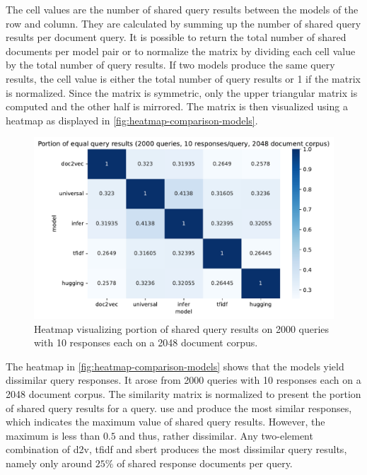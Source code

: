The cell values are the number of shared query results between the models of the row and column.
They are calculated by summing up the number of shared query results per document query.
It is possible to return the total number of shared documents per model pair
or to normalize the matrix by dividing each cell value by the total number of query results.
If two models produce the same query results, the cell value is either the total number of query results or 1 if the matrix is normalized.
Since the matrix is symmetric, only the upper triangular matrix is computed and the other half is mirrored.
The matrix is then visualized using a heatmap as displayed in \autoref{fig:heatmap-comparison-models}.

\begin{figure}[!htb] %
    \centering
    \includegraphics[width=1\textwidth]{images/comparison/Portion_of_equal_query_results_(2000_queries,_10_responses_query,_2048_document_corpus).pdf}
    \caption[Comparison of models using a heatmap]
    {Heatmap visualizing portion of shared query results on 2000 queries with 10 responses each on a 2048 document corpus.}
    \label{fig:heatmap-comparison-models}
\end{figure}

The heatmap in \autoref{fig:heatmap-comparison-models} shows that the models yield dissimilar query responses.
It arose from 2000 queries with 10 responses each on a 2048 document corpus.
The similarity matrix is normalized to present the portion of shared query results for a query.
\ac{use} and \infersent{} produce the most similar responses, which indicates the maximum value of shared query results.
However, the maximum is less than $0.5$ and thus, rather dissimilar.
Any two-element combination of \ac{d2v}, \ac{tfidf} and \ac{sbert} produces the most dissimilar query results, 
namely only around $25\%$ of shared response documents per query.

